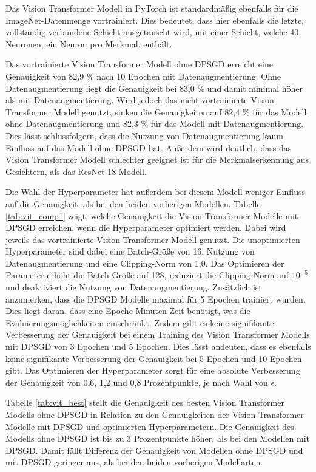 Das Vision Transformer Modell in PyTorch ist standardmäßig ebenfalls für die ImageNet-Datenmenge vortrainiert.
Dies bedeutet, dass hier ebenfalls die letzte, vollständig verbundene Schicht ausgetauscht wird, mit einer Schicht, welche 40 Neuronen, ein Neuron pro Merkmal, enthält.

Das vortrainierte Vision Transformer Modell ohne DPSGD erreicht eine Genauigkeit von 82,9 \% nach 10 Epochen mit Datenaugmentierung. 
Ohne Datenaugmentierung liegt die Genauigkeit bei 83,0 \% und damit minimal höher als mit Datenaugmentierung.
Wird jedoch das nicht-vortrainierte Vision Transformer Modell genutzt, sinken die Genauigkeiten auf 82,4 \% für das Modell ohne Datenaugmentierung und 82,3 \% für das Modell mit Datenaugmentierung.
Dies lässt schlussfolgern, dass die Nutzung von Datenaugmentierung kaum Einfluss auf das Modell ohne DPSGD hat.
Außerdem wird deutlich, dass das Vision Transformer Modell schlechter geeignet ist für die Merkmalserkennung aus Gesichtern, als das ResNet-18 Modell.



Die Wahl der Hyperparameter hat außerdem bei diesem Modell weniger Einfluss auf die Genauigkeit, als bei den beiden vorherigen Modellen.
Tabelle \ref{tab:vit_comp1} zeigt, welche Genauigkeit die Vision Transformer Modelle mit DPSGD erreichen, wenn die Hyperparameter optimiert werden.
Dabei wird jeweils das vortrainierte Vision Transformer Modell genutzt.
Die unoptimierten Hyperparameter sind dabei eine Batch-Größe von 16, Nutzung von Datenaugmentierung und eine Clipping-Norm von 1,0.
Das Optimieren der Parameter erhöht die Batch-Größe auf 128, reduziert die Clipping-Norm auf $10^{-5}$ und deaktiviert die Nutzung von Datenaugmentierung.
Zusätzlich ist anzumerken, dass die DPSGD Modelle maximal für 5 Epochen trainiert wurden. 
Dies liegt daran, dass eine Epoche  Minuten Zeit benötigt, was die Evaluierungsmöglichkeiten einschränkt.
Zudem gibt es keine signifikante Verbesserung der Genauigkeit bei einem Training des Vision Transformer Modells mit DPSGD von 3 Epochen und 5 Epochen.
Dies lässt andeuten, dass es ebenfalls keine signifikante Verbesserung der Genauigkeit bei 5 Epochen und 10 Epochen gibt.
Das Optimieren der Hyperparameter sorgt für eine absolute Verbesserung der Genauigkeit von 0,6, 1,2 und 0,8 Prozentpunkte, je nach Wahl von $\epsilon$.


Tabelle \ref{tab:vit_best} stellt die Genauigkeit des besten Vision Transformer Modells ohne DPSGD in Relation zu den Genauigkeiten der Vision Transformer Modelle mit DPSGD und optimierten Hyperparametern.
Die Genauigkeit des Modells ohne DPSGD ist bis zu 3 Prozentpunkte höher, als bei den Modellen mit DPSGD. 
Damit fällt Differenz der Genauigkeit von Modellen ohne DPSGD und mit DPSGD geringer aus, als bei den beiden vorherigen Modellarten.

